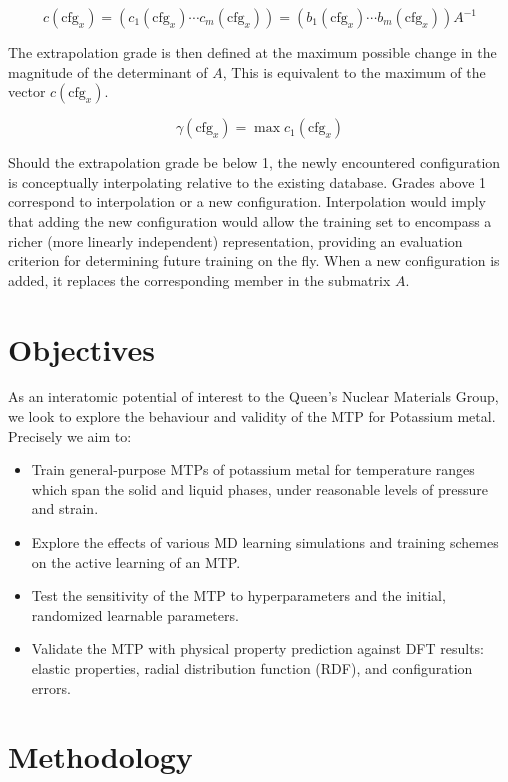 \documentclass[9pt,twocolumn,twoside]{opticajnl}
\begin{document}
\begin{equation} \label{eq:actLearn}
  c(\textrm{cfg}_x)  = (c_1(\textrm{cfg}_x) \cdots c_m(\textrm{cfg}_x)) = (b_1(\textrm{cfg}_x) \cdots b_m(\textrm{cfg}_x)) A^{-1}
\end{equation}

The extrapolation grade is then defined at the maximum possible change in the magnitude of the determinant of $A$, This is equivalent to the maximum of the vector $c(\textrm{cfg}_x)$.

\begin{equation}
  \gamma(\textrm{cfg}_x) = \max c_1(\textrm{cfg}_x)
\end{equation}

Should the extrapolation grade be below 1, the newly encountered configuration is conceptually interpolating relative to the existing database. Grades above 1 correspond to interpolation or a new configuration. Interpolation would imply that adding the new configuration would allow the training set to encompass a richer (more linearly independent) representation, providing an evaluation criterion for determining future training on the fly. When a new configuration is added, it replaces the corresponding member in the submatrix $A$.

\section{Objectives}
As an interatomic potential of interest to the Queen's Nuclear Materials Group, we look to explore the behaviour and validity of the MTP for Potassium metal. Precisely we aim to:
\begin{itemize}
  \itemsep0em
  \item Train general-purpose MTPs of potassium metal for temperature ranges which span the solid and liquid phases, under reasonable levels of pressure and strain. 
  \item Explore the effects of various MD learning simulations and training schemes on the active learning of an MTP.
  \item  Test the sensitivity of the MTP to hyperparameters and the initial, randomized learnable parameters. 
  \item Validate the MTP with physical property prediction against DFT results: elastic properties, radial distribution function (RDF), and configuration errors.
\end{itemize}


\section{Methodology}
\end{document}
